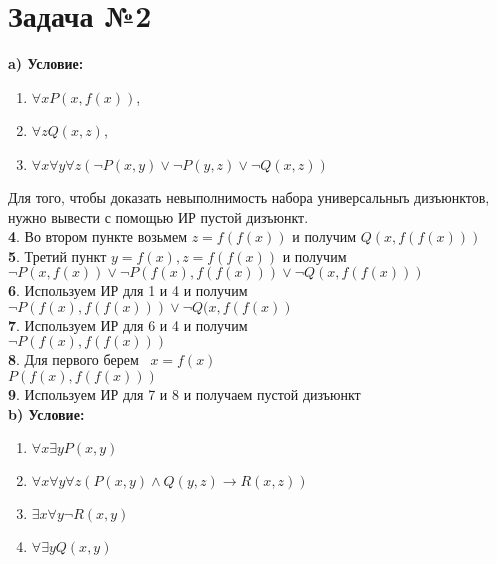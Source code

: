 \documentclass[a4paper,12pt]{article} %
\begin{document}
\section*{Задача №2}
\textbf{a) Условие:}
\begin{enumerate}
    \item $\forall x P(x, f(x))$,
    \item $\forall z Q(x, z)$, 
    \item $\forall x \forall y \forall z (\neg P(x, y) \vee \neg P(y, z) \vee \neg Q(x,z)) $
\end{enumerate}
Для того, чтобы доказать невыполнимость 
набора универсальныъ дизъюнктов, нужно вывести с помощью ИР пустой дизъюнкт.
\\
\textbf{4}. Во втором пункте возьмем $z = f(f(x))$ и получим $ Q(x, f(f(x)))$ \\
\textbf{5}. Третий пункт $y = f(x), z = f(f(x))$ и получим\\
$\neg P(x, f(x)) \vee \neg P(f(x), f(f(x))) \vee \neg Q(x,f(f(x))) $\\
\textbf{6}. Используем ИР для 1 и 4 и получим \\
$\neg P(f(x), f(f(x))) \vee \neg Q(x,f(f(x))$ \\
\textbf{7}. Используем ИР для 6 и 4 и получим \\
$\neg P(f(x), f(f(x))) $ \\
\textbf{8}. Для первого берем  $x = f(x)$ \\
$P(f(x), f(f(x)))$ \\
\textbf{9}. Используем ИР для 7 и 8 и получаем пустой дизъюнкт\\

\textbf{b) Условие:}
\begin{enumerate}
    \item $\forall x \exists y P(x, y)$
    \item $\forall x \forall y \forall z (P(x, y) \wedge Q(y, z) \rightarrow R(x, z))$
    \item $\exists x \forall y \neg R(x, y)$
    \item $\forall \exists y Q(x,y)$ \\
\end{enumerate}
\end{document}
